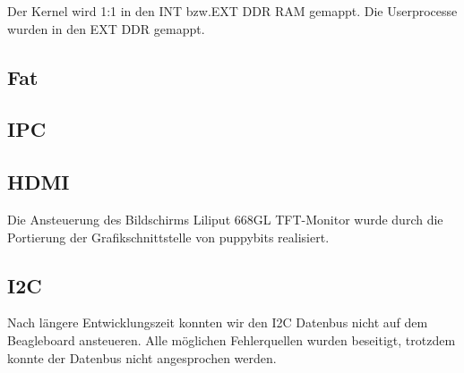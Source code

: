 \documentclass[10pt,a4paper]{article}
\begin{document}
Der Kernel wird 1:1 in den INT bzw.EXT DDR RAM gemappt. Die Userprocesse wurden in den EXT DDR gemappt.
\newpage

\subsection{Fat}

\newpage
\subsection{IPC}
\newpage
\subsection{HDMI}
Die Ansteuerung des Bildschirms Liliput 668GL TFT-Monitor wurde durch die Portierung der Grafikschnittstelle von puppybits realisiert.
\newpage
\subsection{I2C}
Nach längere Entwicklungszeit konnten wir den I2C Datenbus nicht auf dem Beagleboard ansteueren. Alle möglichen Fehlerquellen wurden beseitigt, trotzdem konnte der Datenbus nicht angesprochen werden.
\end{document}
